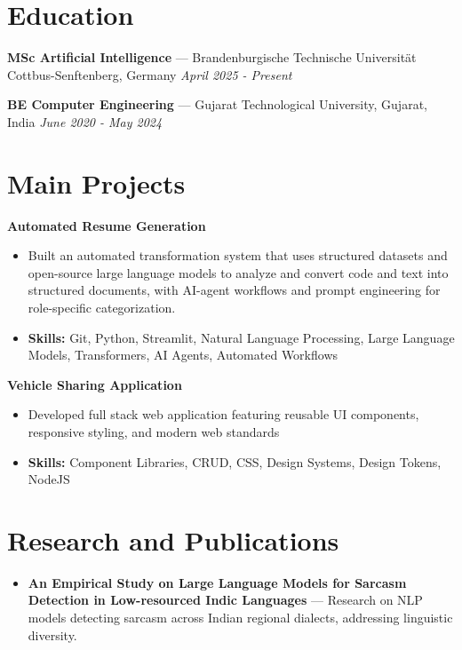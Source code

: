 \documentclass[a4paper,10pt]{article}
\begin{document}
\section*{Education}
\textbf{MSc Artificial Intelligence} — Brandenburgische Technische Universität Cottbus-Senftenberg, Germany \hfill \textit{April 2025 - Present}\par
\vspace{1.5pt}
\textbf{BE Computer Engineering} — Gujarat Technological University, Gujarat, India \hfill \textit{June 2020 - May 2024}\par

\section*{Main Projects}
\textbf{Automated Resume Generation}\par
\vspace{1pt}
\begin{itemize}
  \item Built an automated transformation system that uses structured datasets and open-source large language models to analyze and convert code and text into structured documents, with AI-agent workflows and prompt engineering for role-specific categorization.
  \item \textbf{Skills:} Git, Python, Streamlit, Natural Language Processing, Large Language Models, Transformers, AI Agents, Automated Workflows
\end{itemize}
\vspace{3pt}
\textbf{Vehicle Sharing Application}\par
\vspace{1pt}
\begin{itemize}
  \item Developed full stack web application featuring reusable UI components, responsive styling, and modern web standards
  \item \textbf{Skills:} Component Libraries, CRUD, CSS, Design Systems, Design Tokens, NodeJS
\end{itemize}

\section*{Research and Publications}
\begin{itemize}
\item \textbf{An Empirical Study on Large Language Models for Sarcasm Detection in Low-resourced Indic Languages} — Research on NLP models detecting sarcasm across Indian regional dialects, addressing linguistic diversity.
\end{itemize}
\end{document}
